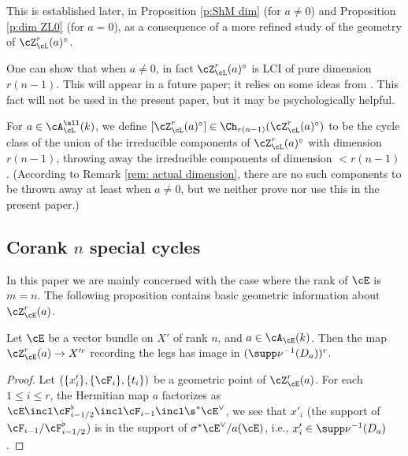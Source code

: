 This is established later, in Proposition \ref{p:ShM dim} (for $a\ne0$) and Proposition \ref{p:dim ZL0} (for $a=0$),  as a consequence of a more refined study of the geometry of $\cZ_{\cL}^{r}(a)^{\circ}$.

\begin{remark}
\notready\label{rem: actual dimension}
One can show that when $a\ne0$, in fact $\cZ_{\cL}^{r}(a)^{\circ}$ is LCI of pure dimension $r(n-1)$. This will appear in a future paper; it relies on some ideas from \cite{FYZ2}. This fact will not be used in the present paper, but it may be psychologically helpful.
\end{remark}

\begin{defn}
\notready\label{def: m=1 cycle class}
For $a \in \cA^{\all}_{\cL}(k)$, we define $[ \cZ_{\cL}^{r}(a)^{\circ} ] \in \Ch_{r(n-1)}( \cZ_{\cL}^{r}(a)^{\circ})$ to be the cycle class of the union of the irreducible components of $\cZ_{\cL}^{r}(a)^{\circ} $ with dimension $r(n-1)$, throwing away the irreducible components of dimension $<r(n-1)$. (According to Remark \ref{rem: actual dimension}, there are no such components to be thrown away at least when $a\ne0$, but we neither prove nor use this in the present paper.)
\end{defn}




\subsection{Corank $n$ special cycles}
In this paper we are mainly concerned with the case where the rank of $\cE$ is $m=n$.   The following proposition contains basic geometric information about $\cZ^{r}_{\cE}(a)$.

\begin{lemma}
\notready\label{l:KR cycle legs}
Let $\cE$ be a vector bundle on $X'$ of rank $n$, and $a\in \cA_{\cE}(k)$. Then the map $\cZ^{r}_{\cE}(a)\to X'^{r}$ recording  the legs has image in $(\supp\nu^{-1}(D_{a}))^{r}$.
\end{lemma}
\begin{proof} Let $(\{x'_{i}\}, \{\cF_{i}\}, \{t_{i}\})$ be a geometric point of $\cZ^{r}_{\cE}(a)$. For each $1\le i\le r$,  the Hermitian map $a$ factorizes as $\cE\incl \cF^{\flat}_{i-1/2}\incl \cF_{i-1}\incl \s^{*}\cE^{\vee}$, we see that $x'_{i}$ (the support of $\cF_{i-1}/\cF^{\flat}_{i-1/2}$) is in the support of $\sigma^*\cE^{\vee}/a(\cE)$, i.e., $x'_{i}\in \supp \nu^{-1}(D_{a})$.
\end{proof}


